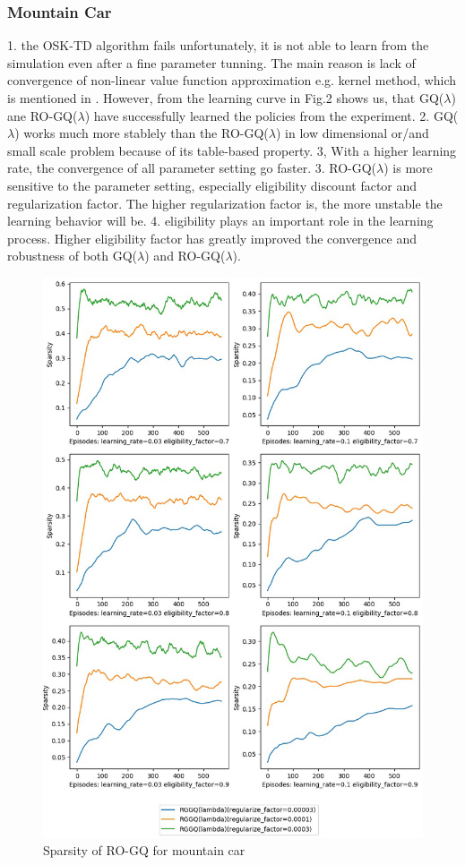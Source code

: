 \documentclass[conference]{IEEEtran}
\begin{document}
\subsubsection{Mountain Car}
1. the OSK-TD algorithm fails unfortunately, it is not able to learn from the simulation even after a fine parameter tunning. The main reason is lack of convergence of non-linear value function approximation e.g. kernel method, which is mentioned in \cite{tsitsiklis1997analysis}. However, from the learning curve in Fig.2 shows us, that GQ($\lambda$) ane RO-GQ($\lambda$) have successfully learned the policies from the experiment. 2. GQ($\lambda$) works much more stablely than the RO-GQ($\lambda$) in low dimensional or/and small scale problem because of its table-based property. 3, With a higher learning rate, the convergence of all parameter setting go faster. 3. RO-GQ($\lambda$) is more sensitive to the parameter setting, especially eligibility discount factor and regularization factor. The higher regularization factor is, the more unstable the learning behavior will be. 4. eligibility plays an important role in the learning process. Higher eligibility factor has greatly improved the convergence and robustness of both GQ($\lambda$) and RO-GQ($\lambda$). 
\begin{figure}[ht]
  \centering
  \includegraphics[scale=0.3]{SparsityMountainCar.jpg}
  \caption{Sparsity of RO-GQ for mountain car}
  \label{fig4}
\end{figure}
\end{document}
